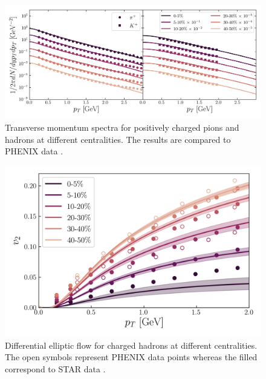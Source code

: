 \begin{figure}[h!]
	\includegraphics{images/plot_ptspectra_bulk.png}
	\caption{\normalsize Transverse momentum spectra for positively charged pions and hadrons at different centralities. The results are compared to {\sffamily PHENIX} data \cite{Adler:2003cb}.}
\end{figure}

\begin{figure}[!hbt]
	\includegraphics[width=\textwidth]{images/vn_pt_bulk.png}
	\caption{\normalsize Differential elliptic flow for charged hadrons at different centralities. The open symbols represent {\sffamily PHENIX} data points \cite{Adare:2011tg} whereas the filled correspond to {\sffamily STAR} data \cite{Adams:2004bi}.} 
\end{figure}


